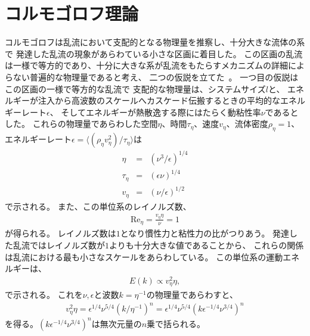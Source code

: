 \documentclass[12pt,a4paper]{jbook}
\begin{document}
        \section{コルモゴロフ理論}
        コルモゴロフは乱流において支配的となる物理量を推察し、十分大きな流体の系で
        発達した乱流の現象があらわている小さな区画に着目した。
        この区画の乱流は一様で等方的であり、十分に大きな系が乱流をもたらすメカニズムの詳細によらない普遍的な物理量であると考え、
        二つの仮説を立てた~\cite{Kolmogorov}。
        一つ目の仮説はこの区画の一様で等方的な乱流で
        支配的な物理量は、システムサイズ$l$と、
        エネルギーが注入から高波数のスケールへカスケード伝搬するときの平均的なエネルギーレート$\epsilon$、
        そしてエネルギーが熱散逸する際にはたらく動粘性率$\nu$であるとした。
        これらの物理量であらわした空間$\eta$、時間$\tau_\eta$、速度$v_\eta$、流体密度$\rho_\eta=1$、
        エネルギーレート$\epsilon=\langle (\rho_\eta v_\eta^2)/\tau_\eta \rangle$は
        \begin{eqnarray}
            \eta & = & \left( \nu^3 / \epsilon
            \right)^{1/4} \nonumber
            \\
            \tau_\eta & = & (\epsilon \nu)^{1/4} \nonumber
            \\
            v_\eta & = & (\nu / \epsilon)^{1/2}
        \end{eqnarray}
        で示される。
        また、この単位系のレイノルズ数、
        \begin{eqnarray}
            \textrm{Re}_{\eta} = \frac{v_{\eta} \eta}{\nu} = 1
        \end{eqnarray}
        が得られる。
        レイノルズ数は$1$となり慣性力と粘性力の比がつりあう。
        発達した乱流ではレイノルズ数が$1$よりも十分大きな値であることから、
        これらの関係は乱流における最も小さなスケールをあらわしている。
        この単位系の運動エネルギーは、
        \begin{eqnarray}
            E(k) \propto  v_\eta^2 \eta,
        \end{eqnarray}
        で示される。
        これを$\nu, \epsilon$と波数$k=\eta^{-1}$の物理量であらわすと、
        \begin{eqnarray}
            v_\eta^2 \eta = \epsilon^{1/4} \nu^{5/4} (k / \eta^{-1})^n = \epsilon^{1/4} \nu^{5/4} (k \epsilon^{-1/4} \nu^{3/4})^n
        \end{eqnarray}
        を得る。$(k \epsilon^{-1/4} \nu^{3/4})^n$は無次元量の$n$乗で括られる。
       
\end{document}
